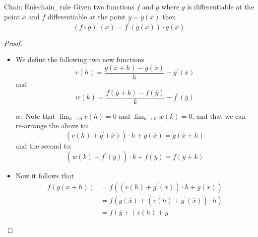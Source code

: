 \begin{theorem}{Chain Rule}{chain_rule}
    Given two functions $ f $ and $ g $ where $ g $ is differentiable at the
    point $ \overline{x}  $  and $ f $ differentiable at the point $
    \overline{y} =  g\left( \overline{x}  \right)  $ then
    \[
    \left( f \circ g \right) ^{ \prime }  \left( \overline{x}  \right) =  f ^{
    \prime } \left( g\left( \overline{x}  \right)  \right) \cdot g\left(
\overline{x}  \right) 
    \]
\end{theorem}

\begin{proof}
    \begin{itemize}
        \item We define the following two new functions
            \[
            v\left( h \right) =  \frac{g\left( \overline{x} +  h \right) -
            g\left( \overline{x} \right) }{h} -  g ^{ \prime } \left(
        \overline{x} \right)  
            \]
            and
            \[
            w\left( k \right) =  \frac{f\left(
            \overline{y}  +  k \right) -  f\left( \overline{y} \right) }{k} -  f
            ^{ \prime } \left( \overline{y}  \right) 
            \]
        \item[$ \alpha: $] Note that $ \lim_{ h \to 0 } v\left( h \right) = 0 $
            and $ \lim_{ k \to 0 } w\left( k \right)  = 0 $, and that we can
            re-arrange the above to:
            \[
            \left( v\left( h \right) +  g ^{ \prime } \left( \overline{x}
            \right)  \right) \cdot h +  g\left( \overline{x}  \right) = g\left(
        \overline{x} + h \right) 
            \]
            and the second to:
            \[
            \left( w\left( k \right) +  f ^{ \prime } \left( \overline{y}
            \right)  \right) \cdot k +  f\left( \overline{y}  \right) = f\left(
            \overline{y} + k \right) 
            \]
        \item Now it follows that
            \begin{align*}
                f\left( g\left( \overline{x} + h \right)  \right) &= f\left(
                \left( v\left( h \right) +  g ^{ \prime } \left( \overline{x}
                \right)  \right) \cdot h +  g\left( \overline{x}  \right)
                \right) \\ 
                &= f\left(g\left( \overline{x}  \right) + \left(    v\left( h
                \right) +  g ^{ \prime } \left( \overline{x}  \right)  \right)
                \cdot h  \right) \\
                &= f\left( \overline{y}  + \left(    v\left( h \right) +  g ^{
}
\end{align*}
\end{itemize}
\end{proof}
